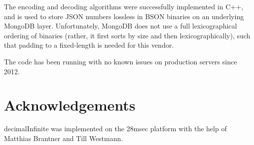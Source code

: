 \documentclass{acm_proc_article-sp}
\begin{document}
The encoding and decoding algorithms were successfully implemented in C++, and is used to store JSON numbers lossless in BSON binaries on an underlying MongoDB layer. Unfortunately, MongoDB does not use a full lexicographical ordering of binaries (rather, it first sorts by size and then lexicographically), such that padding to a fixed-length is needed for this vendor.

The code has been running with no known issues on production servers since 2012.

\section{Acknowledgements}
decimalInfinite was implemented on the 28msec platform with the help of Matthias Brantner and Till Westmann.
\end{document}
